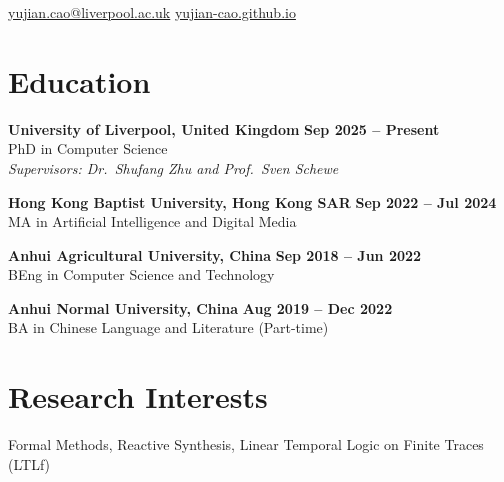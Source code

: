 \documentclass{resume}
\begin{document}
\begin{center}
    \href{mailto:yujian.cao@liverpool.ac.uk}{yujian.cao@liverpool.ac.uk}
    \hspace{1.2em}
    \href{https://yujian-cao.github.io/}{yujian-cao.github.io}
\end{center}


\section{Education} 
\begin{content}
    {\bf University of Liverpool, United Kingdom} \hfill {\bf Sep 2025 -- Present} \\
    {PhD in Computer Science} \\
    {\em Supervisors: Dr.\ Shufang Zhu and Prof.\ Sven Schewe}
    
    \vspace{0.4\baselineskip}

    {\bf Hong Kong Baptist University, Hong Kong SAR} \hfill {\bf Sep 2022 -- Jul 2024} \\
    {MA in Artificial Intelligence and Digital Media}
    
    \vspace{0.4\baselineskip}

    {\bf Anhui Agricultural University, China} \hfill {\bf Sep 2018 -- Jun 2022} \\
    {BEng in Computer Science and Technology}
    
    \vspace{0.4\baselineskip}

    {\bf Anhui Normal University, China} \hfill {\bf Aug 2019 -- Dec 2022} \\
    {BA in Chinese Language and Literature (Part-time)}
    
\sectionlineskip
\end{content}

\section{Research Interests}
\begin{content}
    Formal Methods, Reactive Synthesis, Linear Temporal Logic on Finite Traces (LTLf)
\sectionlineskip
\end{content}
\end{document}
